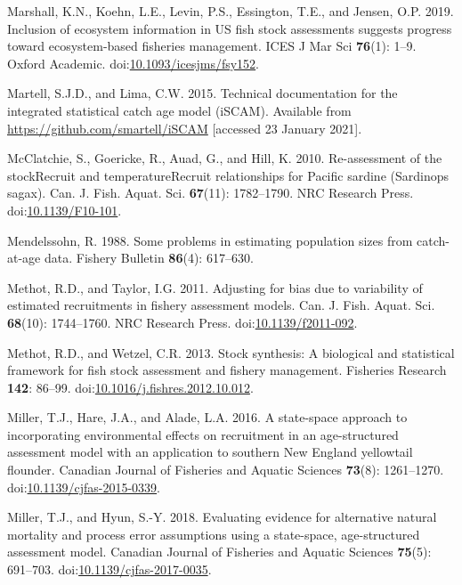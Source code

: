 \documentclass[]{article}
\begin{document}
\leavevmode\hypertarget{ref-marshall2019Inclusion}{}%
Marshall, K.N., Koehn, L.E., Levin, P.S., Essington, T.E., and Jensen,
O.P. 2019. Inclusion of ecosystem information in US fish stock
assessments suggests progress toward ecosystem-based fisheries
management. ICES J Mar Sci \textbf{76}(1): 1--9. Oxford Academic.
doi:\href{https://doi.org/10.1093/icesjms/fsy152}{10.1093/icesjms/fsy152}.

\leavevmode\hypertarget{ref-martell2015Technical}{}%
Martell, S.J.D., and Lima, C.W. 2015. Technical documentation for the
integrated statistical catch age model (iSCAM). Available from
\url{https://github.com/smartell/iSCAM} {[}accessed 23 January 2021{]}.

\leavevmode\hypertarget{ref-mcclatchie2010Reassessment}{}%
McClatchie, S., Goericke, R., Auad, G., and Hill, K. 2010. Re-assessment
of the stockRecruit and temperatureRecruit relationships for Pacific
sardine (Sardinops sagax). Can. J. Fish. Aquat. Sci. \textbf{67}(11):
1782--1790. NRC Research Press.
doi:\href{https://doi.org/10.1139/F10-101}{10.1139/F10-101}.

\leavevmode\hypertarget{ref-mendelssohn1988Problems}{}%
Mendelssohn, R. 1988. Some problems in estimating population sizes from
catch-at-age data. Fishery Bulletin \textbf{86}(4): 617--630.

\leavevmode\hypertarget{ref-methot2011Adjusting}{}%
Methot, R.D., and Taylor, I.G. 2011. Adjusting for bias due to
variability of estimated recruitments in fishery assessment models. Can.
J. Fish. Aquat. Sci. \textbf{68}(10): 1744--1760. NRC Research Press.
doi:\href{https://doi.org/10.1139/f2011-092}{10.1139/f2011-092}.

\leavevmode\hypertarget{ref-methot2013Stock}{}%
Methot, R.D., and Wetzel, C.R. 2013. Stock synthesis: A biological and
statistical framework for fish stock assessment and fishery management.
Fisheries Research \textbf{142}: 86--99.
doi:\href{https://doi.org/10.1016/j.fishres.2012.10.012}{10.1016/j.fishres.2012.10.012}.

\leavevmode\hypertarget{ref-miller2016Statespace}{}%
Miller, T.J., Hare, J.A., and Alade, L.A. 2016. A state-space approach
to incorporating environmental effects on recruitment in an
age-structured assessment model with an application to southern New
England yellowtail flounder. Canadian Journal of Fisheries and Aquatic
Sciences \textbf{73}(8): 1261--1270.
doi:\href{https://doi.org/10.1139/cjfas-2015-0339}{10.1139/cjfas-2015-0339}.

\leavevmode\hypertarget{ref-miller2018Evaluating}{}%
Miller, T.J., and Hyun, S.-Y. 2018. Evaluating evidence for alternative
natural mortality and process error assumptions using a state-space,
age-structured assessment model. Canadian Journal of Fisheries and
Aquatic Sciences \textbf{75}(5): 691--703.
doi:\href{https://doi.org/10.1139/cjfas-2017-0035}{10.1139/cjfas-2017-0035}.
\end{document}
